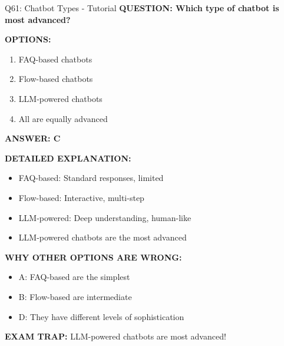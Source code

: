 \documentclass[8pt]{beamer}
\begin{document}
	\begin{frame}{Q61: Chatbot Types - Tutorial}
		\fontsize{6.5}{7.5}\selectfont
		\textbf{QUESTION: Which type of chatbot is most advanced?}
		
		\vspace{0.1cm}
		\textbf{OPTIONS:}
		\begin{enumerate}
			\item FAQ-based chatbots
			\item Flow-based chatbots
			\item LLM-powered chatbots
			\item All are equally advanced
		\end{enumerate}
		
		\vspace{0.1cm}
		\textcolor{myblue}{\textbf{ANSWER: C}}
		
		\vspace{0.1cm}
		\textbf{DETAILED EXPLANATION:}
		\begin{itemize}
			\item FAQ-based: Standard responses, limited
			\item Flow-based: Interactive, multi-step
			\item LLM-powered: Deep understanding, human-like
			\item LLM-powered chatbots are the most advanced
		\end{itemize}
		
		\vspace{0.1cm}
		\textcolor{myred}{\textbf{WHY OTHER OPTIONS ARE WRONG:}}
		\begin{itemize}
			\item \textcolor{myred}{A:} FAQ-based are the simplest
			\item \textcolor{myred}{B:} Flow-based are intermediate
			\item \textcolor{myred}{D:} They have different levels of sophistication
		\end{itemize}
		
		\textcolor{myred}{\textbf{EXAM TRAP:}} LLM-powered chatbots are \textcolor{myblue}{most advanced}!
	\end{frame}
	
\end{document}
